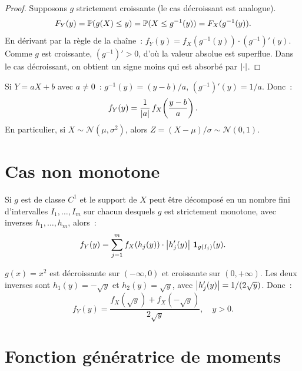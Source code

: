 \begin{proof}
Supposons $g$ strictement croissante (le cas d\'ecroissant est analogue).
\begin{align*}
    F_Y(y) = \mathbb{P}(g(X) \leq y) = \mathbb{P}(X \leq g^{-1}(y)) = F_X(g^{-1}(y)).
\end{align*}
En d\'erivant par la r\`egle de la cha\^ine~:
$f_Y(y) = f_X(g^{-1}(y)) \cdot (g^{-1})'(y)$.
Comme $g$ est croissante, $(g^{-1})' > 0$, d'o\`u la valeur absolue est superflue.
Dans le cas d\'ecroissant, on obtient un signe moins qui est absorb\'e par $\left| \cdot \right|$.
\end{proof}

\begin{exemple}
Si $Y = aX + b$ avec $a \neq 0$~:
$g^{-1}(y) = (y-b)/a$, $(g^{-1})'(y) = 1/a$. Donc~:
\[
    f_Y(y) = \frac{1}{\left| a \right|}\, f_X\!\left(\frac{y-b}{a}\right).
\]
En particulier, si $X \sim \mathcal{N}(\mu, \sigma^2)$, alors
$Z = (X-\mu)/\sigma \sim \mathcal{N}(0,1)$.
\end{exemple}

\section{Cas non monotone}

\begin{theoreme}
Si $g$ est de classe $C^1$ et le support de $X$ peut \^etre d\'ecompos\'e en un
nombre fini d'intervalles $I_1, \ldots, I_m$ sur chacun desquels $g$ est
strictement monotone, avec inverses $h_1, \ldots, h_m$, alors~:
\[
    f_Y(y) = \sum_{j=1}^{m} f_X(h_j(y)) \cdot \left| h_j'(y) \right|\, \mathbf{1}_{g(I_j)}(y).
\]
\end{theoreme}

\begin{exemple}[$Y = X^2$ avec $X$ de densit\'e $f_X$ sym\'etrique]
$g(x) = x^2$ est d\'ecroissante sur $(-\infty, 0)$ et croissante sur $(0, +\infty)$.
Les deux inverses sont $h_1(y) = -\sqrt{y}$ et $h_2(y) = \sqrt{y}$, avec
$\left| h_j'(y) \right| = 1/(2\sqrt{y})$. Donc~:
\[
    f_Y(y) = \frac{f_X(\sqrt{y}) + f_X(-\sqrt{y})}{2\sqrt{y}}, \quad y > 0.
\]
\end{exemple}

\section{Fonction g\'en\'eratrice de moments}


